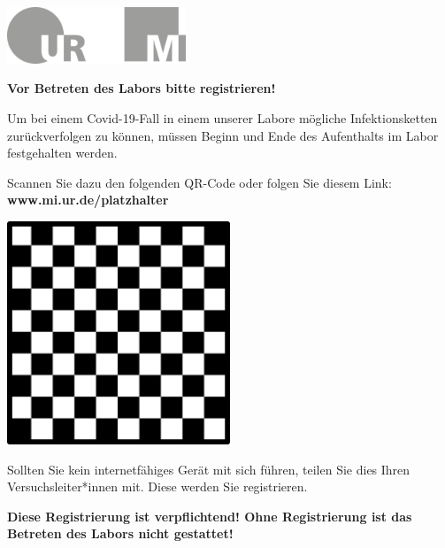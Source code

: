 \documentclass[24pt, a4paper, portrait]{article}
\begin{document}
\pagestyle{empty}

\raggedleft

\includegraphics[width=0.4\textwidth]{logo}

\vspace{1cm}
\sffamily
\centering
\huge

\textbf{Vor Betreten des Labors bitte registrieren!}

\vspace{1cm}

\raggedright
\Large

Um bei einem Covid-19-Fall in einem unserer Labore mögliche Infektionsketten zurückverfolgen zu können, müssen Beginn und Ende des Aufenthalts im Labor festgehalten werden.

Scannen Sie dazu den folgenden QR-Code oder folgen Sie diesem Link: \textbf{www.mi.ur.de/platzhalter}

\vspace{1cm}
\centering
\includegraphics[width=0.5\textwidth]{platzhalter_qr}

\vspace{1cm}
\raggedright
Sollten Sie kein internetfähiges Gerät mit sich führen, teilen Sie dies Ihren Versuchsleiter*innen mit.
Diese werden Sie registrieren.

\vspace{1cm}
\centering
\huge
\textbf{Diese Registrierung ist verpflichtend! Ohne Registrierung ist das Betreten des Labors nicht gestattet!}
\end{document}
